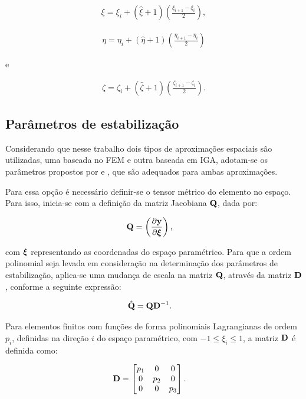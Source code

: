 \documentclass[tese_patricia]{subfiles}
\begin{document}
\begin{align}
\xi = \xi_{i} + \left(\hat{\xi}+1\right) \left(\frac{\xi_{i+1}-\xi_{i}}{2}\right),
\end{align}

\begin{align}
\eta = \eta_{i} + \left(\hat{\eta}+1\right) \left(\frac{\eta_{i+1}-\eta_{i}}{2}\right)
\end{align}

\noindent e

\begin{align}
\zeta = \zeta_{i} + \left(\hat{\zeta}+1\right) \left(\frac{\zeta_{i+1}-\zeta_{i}}{2}\right).
\end{align}

\subsection{Parâmetros de estabilização}\label{subsec:taus2}

Considerando que nesse trabalho dois tipos de aproximações espaciais são utilizadas, uma baseada no FEM e outra baseada em IGA, adotam-se os parâmetros propostos por  e , que são adequados para ambas aproximações. 

Para essa opção é necessário definir-se o tensor métrico do elemento no espaço. Para isso, inicia-se com a definição da matriz Jacobiana $\mathbf{Q}$, dada por:

\begin{align}
	\mathbf{Q}&=\left(\frac{\partial\mathbf{y}}{\partial\bm{\xi}}\right),
\end{align}

\noindent com $\bm{\xi}$ representando as coordenadas do espaço paramétrico. Para que a ordem polinomial seja levada em consideração na determinação dos parâmetros de estabilização, aplica-se uma mudança de escala na matriz $\mathbf{Q}$, através da matriz $\mathbf{D}$, conforme a seguinte expressão:

\begin{align}
	\hat{\mathbf{Q}}&=\mathbf{Q}\mathbf{D}^{-1}.
\end{align}

Para elementos finitos com funções de forma polinomiais Lagrangianas de ordem $p_i$, definidas na direção $i$ do espaço paramétrico, com $-1\leq\xi_i\leq1$, a matriz $\mathbf{D}$ é definida como:

\begin{align}
	\mathbf{D}&=\begin{bmatrix}
		p_{1} & 0 & 0\\
		0 & p_{2} & 0 \\
		0 & 0 & p_{3}
	\end{bmatrix}.
\end{align}
\end{document}
